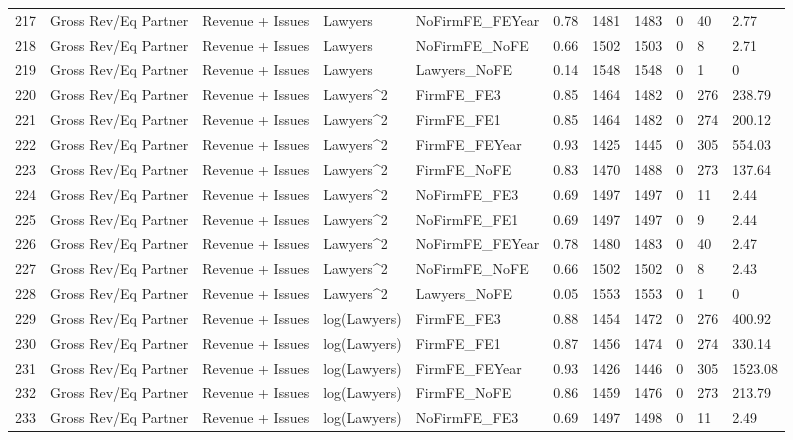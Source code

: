\begin{table}[ht]
\begin{tabular}{rllllllllll}
  217 & Gross Rev/Eq Partner & Revenue + Issues & Lawyers & NoFirmFE\_FEYear & 0.78 & 1481 & 1483 & 0 & 40 & 2.77 \\ 
  218 & Gross Rev/Eq Partner & Revenue + Issues & Lawyers & NoFirmFE\_NoFE & 0.66 & 1502 & 1503 & 0 & 8 & 2.71 \\ 
  219 & Gross Rev/Eq Partner & Revenue + Issues & Lawyers & Lawyers\_NoFE & 0.14 & 1548 & 1548 & 0 & 1 & 0 \\ 
  220 & Gross Rev/Eq Partner & Revenue + Issues & Lawyers^2 & FirmFE\_FE3 & 0.85 & 1464 & 1482 & 0 & 276 & 238.79 \\ 
  221 & Gross Rev/Eq Partner & Revenue + Issues & Lawyers^2 & FirmFE\_FE1 & 0.85 & 1464 & 1482 & 0 & 274 & 200.12 \\ 
  222 & Gross Rev/Eq Partner & Revenue + Issues & Lawyers^2 & FirmFE\_FEYear & 0.93 & 1425 & 1445 & 0 & 305 & 554.03 \\ 
  223 & Gross Rev/Eq Partner & Revenue + Issues & Lawyers^2 & FirmFE\_NoFE & 0.83 & 1470 & 1488 & 0 & 273 & 137.64 \\ 
  224 & Gross Rev/Eq Partner & Revenue + Issues & Lawyers^2 & NoFirmFE\_FE3 & 0.69 & 1497 & 1497 & 0 & 11 & 2.44 \\ 
  225 & Gross Rev/Eq Partner & Revenue + Issues & Lawyers^2 & NoFirmFE\_FE1 & 0.69 & 1497 & 1497 & 0 & 9 & 2.44 \\ 
  226 & Gross Rev/Eq Partner & Revenue + Issues & Lawyers^2 & NoFirmFE\_FEYear & 0.78 & 1480 & 1483 & 0 & 40 & 2.47 \\ 
  227 & Gross Rev/Eq Partner & Revenue + Issues & Lawyers^2 & NoFirmFE\_NoFE & 0.66 & 1502 & 1502 & 0 & 8 & 2.43 \\ 
  228 & Gross Rev/Eq Partner & Revenue + Issues & Lawyers^2 & Lawyers\_NoFE & 0.05 & 1553 & 1553 & 0 & 1 & 0 \\ 
  229 & Gross Rev/Eq Partner & Revenue + Issues & log(Lawyers) & FirmFE\_FE3 & 0.88 & 1454 & 1472 & 0 & 276 & 400.92 \\ 
  230 & Gross Rev/Eq Partner & Revenue + Issues & log(Lawyers) & FirmFE\_FE1 & 0.87 & 1456 & 1474 & 0 & 274 & 330.14 \\ 
  231 & Gross Rev/Eq Partner & Revenue + Issues & log(Lawyers) & FirmFE\_FEYear & 0.93 & 1426 & 1446 & 0 & 305 & 1523.08 \\ 
  232 & Gross Rev/Eq Partner & Revenue + Issues & log(Lawyers) & FirmFE\_NoFE & 0.86 & 1459 & 1476 & 0 & 273 & 213.79 \\ 
  233 & Gross Rev/Eq Partner & Revenue + Issues & log(Lawyers) & NoFirmFE\_FE3 & 0.69 & 1497 & 1498 & 0 & 11 & 2.49 \\ 

\end{tabular}
\end{table}
